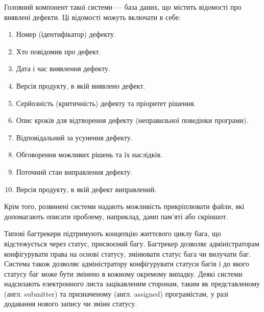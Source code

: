\documentclass[../main.tex]{subfiles}
\begin{document}
Головний компонент такої системи — база даних, що містить відомості про виявлені дефекти. Ці відомості можуть включати в себе:
\begin{enumerate}
	\item Номер (ідентифікатор) дефекту.
	\item Хто повідомив про дефект.
	\item Дата і час виявлення дефекту.
	\item Версія продукту, в якій виявлено дефект.
	\item Серйозність (критичність) дефекту та пріоритет рішення.
	\item Опис кроків для відтворення дефекту (неправильної поведінки програми).
	\item Відповідальний за усунення дефекту.
	\item Обговорення можливих рішень та їх наслідків.
	\item Поточний стан виправлення дефекту.
	\item Версія продукту, в якій дефект виправлений.
\end{enumerate}
Крім того, розвинені системи надають можливість прикріплювати файли, які допомагають описати проблему, наприклад, дамп пам'яті або скріншот.

Типові багтрекери підтримують концепцію життєвого циклу бага, що відстежується через статус, присвоєний багу. Багтрекер дозволяє адміністраторам конфігурувати права на основі статусу, змінювати статус бага чи вилучати баг. Система також дозволяє адміністратору конфігурувати статуси багів і до якого статусу баг може бути змінено в кожному окремому випадку. Деякі системи надсилають електронного листа зацікавленим сторонам, таким як представленому (англ. submitter) та призначеному (англ. assigned) програмістам, у разі додавання нового запису чи зміни статусу.
\end{document}
